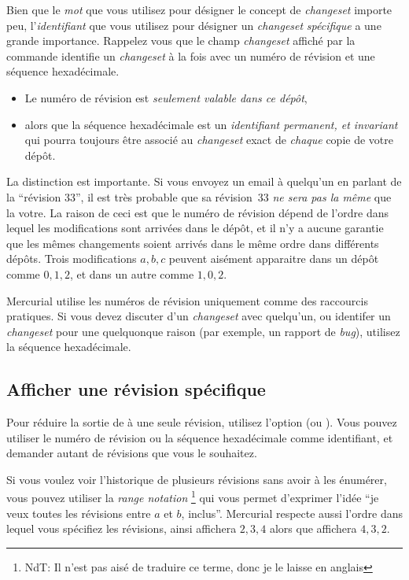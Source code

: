 Bien que le \emph{mot} que vous utilisez pour désigner le concept de
\textit{changeset} importe peu, l'\emph{identifiant} que vous utilisez
pour désigner un \emph{changeset} \textit{spécifique} a une grande
importance. Rappelez vous que le champ \textit{changeset} affiché par la 
commande  identifie un \textit{changeset} à la fois avec
un numéro de révision et une séquence hexadécimale.

\begin{itemize}
\item Le numéro de révision est \emph{seulement valable dans ce dépôt},
\item alors que la séquence hexadécimale est un \emph{identifiant 
	permanent, et invariant } qui pourra toujours être associé au 
	\textit{changeset} exact de \emph{chaque} copie de votre dépôt.
\end{itemize}

La distinction est importante. Si vous envoyez un email à quelqu'un en
parlant de la ``révision 33'', il est très probable que sa révision~33
\emph{ne sera pas la même} que la votre. La raison de ceci est que le
numéro de révision dépend de l'ordre dans lequel les modifications sont
arrivées dans le dépôt, et il n'y a aucune garantie que les mêmes changements
soient arrivés dans le même ordre dans différents dépôts. Trois modifications
$a,b,c$ peuvent aisément apparaitre dans un dépôt comme $0,1,2$, et dans
un autre comme $1,0,2$.

Mercurial utilise les numéros de révision uniquement comme des raccourcis
pratiques. Si vous devez discuter d'un \textit{changeset} avec quelqu'un, 
ou identifer un \textit{changeset} pour une quelquonque %
raison (par exemple, un rapport de \textit{bug}), utilisez la séquence
hexadécimale.

\subsection{Afficher une révision spécifique}

Pour réduire la sortie de  à une seule révision, utilisez
l'option  (ou ). Vous pouvez utiliser
le numéro de révision ou la séquence hexadécimale comme identifiant, et 
demander autant de révisions que vous le souhaitez. 

Si vous voulez voir l'historique de plusieurs révisions sans avoir à 
les énumérer, vous pouvez utiliser la \emph{\textit{range notation}}
\footnote{NdT: Il n'est pas aisé de traduire ce terme, donc je le  %
laisse en anglais} qui vous permet d'exprimer l'idée ``je veux toutes
les révisions entre $a$ et $b$, inclus''.
Mercurial respecte aussi l'ordre dans lequel vous spécifiez les 
révisions, ainsi  affichera $2,3,4$ alors que 
 affichera $4,3,2$.

